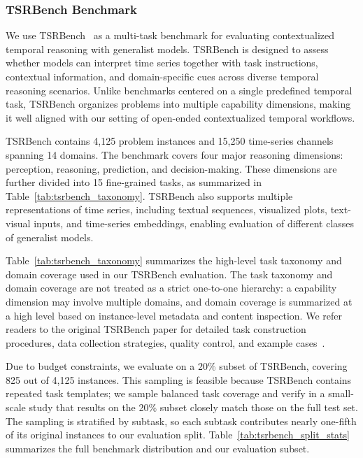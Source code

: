 \subsubsection{TSRBench Benchmark}


We use TSRBench~\citep{DBLP:journals/corr/abs-2601-18744} as a multi-task
benchmark for evaluating contextualized temporal reasoning with generalist
models. TSRBench is designed to assess whether models can interpret time
series together with task instructions, contextual information, and
domain-specific cues across diverse temporal reasoning scenarios. Unlike
benchmarks centered on a single predefined temporal task, TSRBench organizes
problems into multiple capability dimensions, making it well aligned with our
setting of open-ended contextualized temporal workflows.

TSRBench contains 4,125 problem instances and 15,250 time-series channels
spanning 14 domains. The benchmark covers four major reasoning dimensions:
perception, reasoning, prediction, and decision-making. These dimensions are
further divided into 15 fine-grained tasks, as summarized in
Table~\ref{tab:tsrbench_taxonomy}. TSRBench also supports multiple
representations of time series, including textual sequences, visualized plots,
text-visual inputs, and time-series embeddings, enabling evaluation of
different classes of generalist models.

Table~\ref{tab:tsrbench_taxonomy} summarizes the high-level task taxonomy and
domain coverage used in our TSRBench evaluation. The task taxonomy and domain
coverage are not treated as a strict one-to-one hierarchy: a capability
dimension may involve multiple domains, and domain coverage is summarized at a
high level based on instance-level metadata and content inspection. We refer
readers to the original TSRBench paper for detailed task construction
procedures, data collection strategies, quality control, and example
cases~\citep{DBLP:journals/corr/abs-2601-18744}.


Due to budget constraints, we evaluate on a 20\% subset of TSRBench, covering 825 out of 4,125 instances. This sampling is feasible because TSRBench contains repeated task templates; we sample balanced task coverage and verify in a small-scale study that results on the 20\% subset closely match those on the full test set.
The sampling is stratified by subtask, so each subtask contributes nearly one-fifth of its original instances to our evaluation split. Table~\ref{tab:tsrbench_split_stats} summarizes the full benchmark distribution and our evaluation subset.



